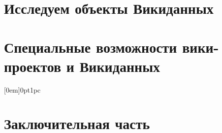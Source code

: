 \documentclass[nofonts,justified,nobib,openany]{tufte-book}%
\newcounter{draft}
\theoremstyle{definition}
\begin{document}
\part{Исследуем объекты Викиданных}
\label{part:research}











\iffalse






\fi

\part{Специальные возможности вики-проектов и Викиданных}
\label{part:advanced}




[0em]{\sffamily\bfseries\large\protect\addvspace{15pt}}{0pt}{1pc}
\part*{Заключительная часть}
\label{part:conclusion}



\backmatter


\begin{fullwidth}
{}
\listoffigures

{}
\listoftables

%
%
\printbibliography[heading=bibintoc]
\end{fullwidth}

\printindex
\end{document}
